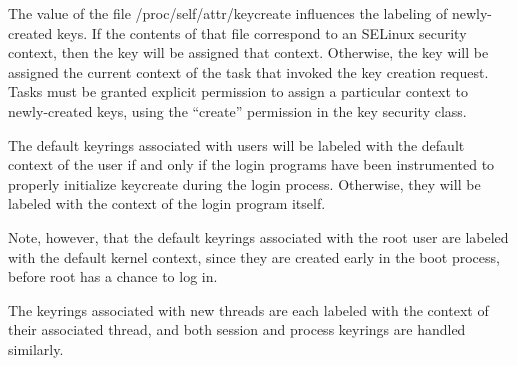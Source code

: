 \documentclass[a4paper,8pt,english]{sphinxmanual}
\begin{document}
The value of the file /proc/self/attr/keycreate influences the labeling of
newly-created keys.  If the contents of that file correspond to an SELinux
security context, then the key will be assigned that context.  Otherwise, the
key will be assigned the current context of the task that invoked the key
creation request.  Tasks must be granted explicit permission to assign a
particular context to newly-created keys, using the ``create'' permission in the
key security class.

The default keyrings associated with users will be labeled with the default
context of the user if and only if the login programs have been instrumented to
properly initialize keycreate during the login process.  Otherwise, they will
be labeled with the context of the login program itself.

Note, however, that the default keyrings associated with the root user are
labeled with the default kernel context, since they are created early in the
boot process, before root has a chance to log in.

The keyrings associated with new threads are each labeled with the context of
their associated thread, and both session and process keyrings are handled
similarly.
\end{document}
